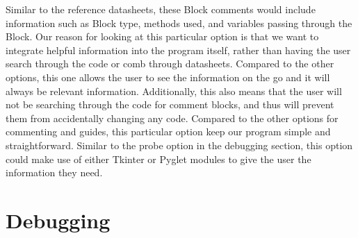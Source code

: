 \documentclass[journal,10pt,onecolumn,compsoc]{IEEEtran} \usepackage[margin=1.0in]{geometry} \usepackage{pdfpages} \usepackage{graphicx}
\begin{document}
Similar to the reference datasheets, these Block comments would include information such as Block type, methods used, and variables passing through the Block. 
Our reason for looking at this particular option is that we want to integrate helpful information into the program itself, rather than having the user search through the code or comb through datasheets. 
Compared to the other options, this one allows the user to see the information on the go and it will always be relevant information. 
Additionally, this also means that the user will not be searching through the code for comment blocks, and thus will prevent them from accidentally changing any code. 
Compared to the other options for commenting and guides, this particular option keep our program simple and straightforward. 
Similar to the probe option in the debugging section, this option could make use of either Tkinter or Pyglet modules to give the user the information they need.
\\
\newpage

\section{Debugging}
\end{document}
